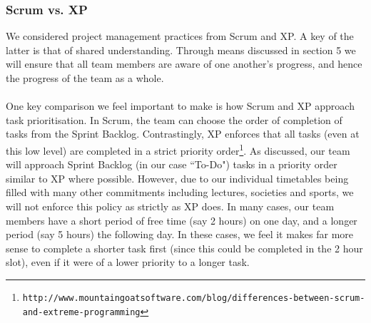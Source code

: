 \documentclass[10pt]{article}
\begin{document}
\subsubsection{Scrum vs. XP}
We considered project management practices from Scrum and XP. A key of the latter is that of shared understanding. Through means discussed in section 5 we will ensure that all team members are aware of one another's progress, and hence the progress of the team as a whole.\\\\
One key comparison we feel important to make is how Scrum and XP approach task prioritisation. In Scrum, the team can choose the order of completion of tasks from the Sprint Backlog. Contrastingly, XP enforces that all tasks (even at this low level) are completed in a strict priority order\footnote{\texttt{http://www.mountaingoatsoftware.com/blog/differences-between-scrum-and-extreme-programming}}. As discussed, our team will approach Sprint Backlog (in our case ``To-Do") tasks in a priority order similar to XP where possible. However, due to our individual timetables being filled with many other commitments including lectures, societies and sports, we will not enforce this policy as strictly as XP does. In many cases, our team members have a short period of free time (say 2 hours) on one day, and a longer period (say 5 hours) the following day. In these cases, we feel it makes far more sense to complete a shorter task first (since this could be completed in the 2 hour slot), even if it were of a lower priority to a longer task.
\end{document}
